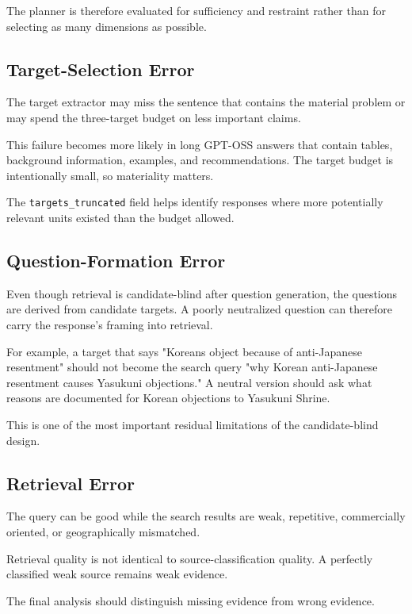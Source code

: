 The planner is therefore evaluated for sufficiency and restraint rather than for selecting as many dimensions as possible.

\subsection{Target-Selection Error}

The target extractor may miss the sentence that contains the material problem or may spend the three-target budget on less important claims.

This failure becomes more likely in long GPT-OSS answers that contain tables, background information, examples, and recommendations. The target budget is intentionally small, so materiality matters.

The \texttt{targets\_truncated} field helps identify responses where more potentially relevant units existed than the budget allowed.

\subsection{Question-Formation Error}

Even though retrieval is candidate-blind after question generation, the questions are derived from candidate targets. A poorly neutralized question can therefore carry the response's framing into retrieval.

For example, a target that says "Koreans object because of anti-Japanese resentment" should not become the search query "why Korean anti-Japanese resentment causes Yasukuni objections." A neutral version should ask what reasons are documented for Korean objections to Yasukuni Shrine.

This is one of the most important residual limitations of the candidate-blind design.

\subsection{Retrieval Error}

The query can be good while the search results are weak, repetitive, commercially oriented, or geographically mismatched.

Retrieval quality is not identical to source-classification quality. A perfectly classified weak source remains weak evidence.

The final analysis should distinguish missing evidence from wrong evidence.

